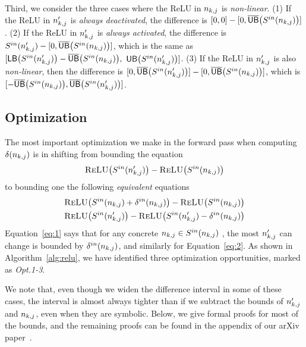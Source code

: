 Third, we consider the three cases where the ReLU in $n_{k,j}$
is \emph{non-linear}.
%
(1) If the ReLU in $ n'_{k,j} $ is \emph{always deactivated}, the
difference is $[0,0] - [0, \overline{\mathsf{UB}}\big(S^{in}(n_{k,j})\big)]$.
%
(2) If the ReLU in $ n'_{k,j} $ is \emph{always activated}, the
difference is $S^{in}(n'_{k,j}) - [0,
\overline{\mathsf{UB}}\big(S^{in}(n_{k,j})\big)]$, which is the same as
$[ \mathsf{LB}\big(S^{in}(n'_{k,j})\big)-\overline{\mathsf{UB}}\big(S^{in}(n_{k,j})\big), $  $ \mathsf{UB}\big(S^{in}(n'_{k,j})\big)
]$.
%
%
(3) If the ReLU in $n'_{k,j}$ is also \emph{non-linear}, then the
difference is $[0, \overline{\mathsf{UB}}\big(S^{in}(n'_{k,j})\big)] - [0,
\overline{\mathsf{UB}}\big(S^{in}(n_{k,j})\big)]$, which is  $[-\overline{\mathsf{UB}}\big(S^{in}(n_{k,j})\big),
\overline{\mathsf{UB}}\big(S^{in}(n'_{k,j})\big)]$.



\subsection{Optimization}
\label{sec:opt}
\newcommand{\R}[1]{\proc{ReLU}\big(#1\big)}
The most important optimization we make in the forward pass when computing
$ \delta(n_{k,j}) $ is in shifting from bounding the equation
\[
\R{\ReluIN{\np}} - \R{\ReluIN{\n}}
\]
to bounding one the following \textit{equivalent} equations
\begin{align}
\R{\ReluIN{\n} + \ReluINdelta{\n}} - \R{\ReluIN{\n}} \label{eq:1}\\
\R{\ReluIN{\np}} - \R{\ReluIN{\np} - \ReluINdelta{\n}} \label{eq:2}
\end{align}
Equation~\ref{eq:1} says that for any concrete $ n_{k,j} \in S^{in}(n_{k,j}) $
, the most $ n'_{k,j} $ can change is bounded by $ \delta^{in}(n_{k,j}) $,
and similarly for Equation~\ref{eq:2}.
As shown in Algorithm~\ref{alg:relu}, we have identified three
optimization opportunities, marked as \emph{Opt.1-3}. We note that,
even though we widen the difference
interval in some of these cases, the interval is almost always tighter
than if we subtract the bounds of $ n'_{k,j} $ and $ n_{k,j} $, even when they
are symbolic. Below, we give formal proofs for most of the bounds,
and the remaining proofs can be found in the appendix
of our arXiv paper~\cite{arxivPaper}.

